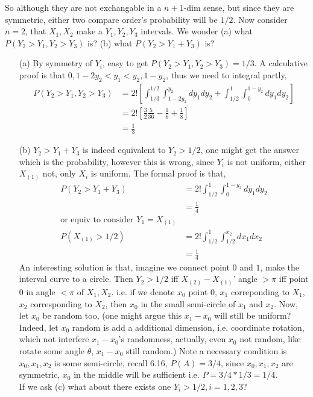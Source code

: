 \documentclass[paper=a4, fontsize=11pt]{scrartcl} %
\numberwithin{equation}{section} %
\numberwithin{figure}{section} %
\numberwithin{table}{section} %
\begin{document}
\begin{itemize}
	So although they are not exchangable in a $n+1$-dim sense, but since they are symmetric, either two compare order's probability will be $1/2$. Now consider $n=2$, that $X_1,X_2$ make a $Y_1,Y_2,Y_3$ intervals. We wonder (a) what $P(Y_2>Y_1, Y_2>Y_3)$ is? (b) what $P(Y_2>Y_1+Y_3)$ is?
	\begin{itemize}
		\item[(a)] By symmetry of $Y_i$, easy to get $P(Y_2>Y_1, Y_2>Y_3) = 1/3$. A calculative proof is that $0,1-2y_2 < y_1 < y_2, 1-y_2$, thus we need to integral partly,
		\begin{align}
			P(Y_2>Y_1, Y_2>Y_3) &= 2! [\int_{1/3}^{1/2}\int_{1-2y_2}^{y_2} dy_1dy_2 + \int_{1/2}^1\int_{0}^{1-y_2}dy_1dy_2] \\ 
				&= 2![\frac{3}{2}\frac{5}{36}-\frac{1}{6} + \frac{1}{8}]\\
				&= \frac{1}{3}
		\end{align}
		\item[(b)] $Y_2>Y_1+Y_3$ is indeed equivalent to $Y_2>1/2$, one might get the answer which is the probability, however this is wrong, since $Y_i$ is not uniform, either $X_{(1)}$ not, only $X_i$ is uniform. The formal proof is that,
		\begin{align}
			P(Y_2>Y_1+Y_3) &= 2! \int_{1/2}^1 \int_0^{1-y_2}dy_1dy_2 \\
				&= \frac{1}{4}\\
			\text{or equiv to consider $Y_1=X_{(1)}$}\\
			P(X_{(1)}>1/2) &= 2! \int_{1/2}^1 \int_{1/2}^{x_2} dx_1dx_2\\
				&= \frac{1}{4}
		\end{align}
		An interesting solution is that, imagine we connect point $0$ and $1$, make the interval curve to a circle. Then $Y_2>1/2$ iff $X_{(2)}- X_{(1)}$' angle $>\pi$ iff point $0$ in angle $<\pi$ of $X_1,X_2$. i.e. if we denote $x_0$ point $0$, $x_1$ correponding to $X_1$, $x_2$ corresponding to $X_2$, then $x_0$ in the small semi-circle of $x_1$ and $x_2$. Now, let $x_0$ be random too, (one might argue this $x_1-x_0$ will still be uniform? Indeed, let $x_0$ random is add a additional dimension, i.e. coordinate rotation, which not interfere $x_1-x_0$'s randomness, actually, even $x_0$ not random, like rotate some angle $\theta$, $x_1-x_0$ still random.) Note a necessary condition is $x_0,x_1,x_2$ is some semi-circle, recall 6.16, $P(A)=3/4$, since $x_0,x_1,x_2$ are symmetric, $x_0$ in the middle will be sufficient i.e. $P=3/4 * 1/3 = 1/4$.\\
		If we ask (c) what about there exists one $Y_i>1/2,i=1,2,3$?

\end{itemize}
\end{itemize}
\end{document}
